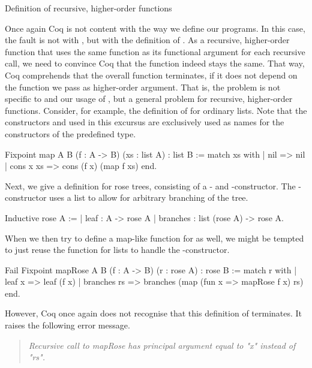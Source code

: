 \begin{excursus}{Definition of recursive, higher\--order functions}

Once again Coq is not content with the way we define our programs.
In this case, the fault is not with , but with the definition of .
As a recursive, higher\--order function that uses the same function as its functional argument for each recursive call, we need to convince Coq that the function indeed stays the same.
That way, Coq comprehends that the overall function terminates, if it does not depend on the function we pass as higher\--order argument.
That is, the problem is not specific to  and our usage of , but a general problem for recursive, higher\--order functions.
Consider, for example, the definition of  for ordinary lists.
Note that the constructors  and  used in this excursus are exclusively used as names for the constructors of the predefined  type.

\begin{coqcode}
Fixpoint map A B (f : A -> B) (xs : list A) : list B :=
 match xs with
 | nil       => nil
 | cons x xs => cons (f x) (map f xs)
 end.
\end{coqcode}

Next, we give a definition for rose trees, consisting of a \-- and \--constructor.
The \--constructor uses a list to allow for arbitrary branching of the tree.

\begin{coqcode}
Inductive rose A :=
| leaf     : A -> rose A
| branches : list (rose A) -> rose A.
\end{coqcode}

When we then try to define a map\--like function for  as well, we might be tempted to just reuse the  function for lists to handle the \--constructor.

\begin{coqcode}
Fail Fixpoint mapRose A B (f : A -> B) (r : rose A) : rose B :=
 match r with
 | leaf x      => leaf (f x)
 | branches rs => branches (map (fun x => mapRose f x) rs)
 end.
\end{coqcode}

However, Coq once again does not recognise that this definition of  terminates.
It raises the following error message.

\begin{quote}
\emph{Recursive call to mapRose has principal argument equal to "x" instead of "rs".}
\end{quote}


\end{excursus}
